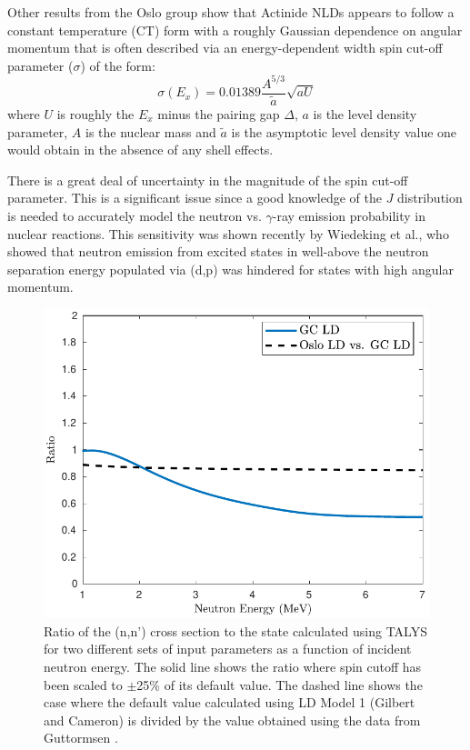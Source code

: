 \documentclass[letterpaper]{ar-1col}
\newcommand{\pp}[1]{\left( #1\right)}
\begin{document}
Other results from the Oslo group show that Actinide NLDs appears to follow a constant temperature (CT) form with a roughly Gaussian dependence on angular momentum that is often described via an energy-dependent width spin cut-off parameter ($\sigma$) of the form: 
\begin{equation}\label{eqn:spin_cutoff}
\sigma\pp{E_x}=0.01389 \dfrac{A^{5/3}}{\widetilde{a}}\sqrt{aU}
\end{equation}
where $U$ is roughly the $E_x$ minus the pairing gap $\Delta$, $a$ is the level density parameter, $A$ is the nuclear mass and $\widetilde{a}$ is the asymptotic level density value one would obtain in the absence of any shell effects.


There is a great deal of uncertainty in the magnitude of the spin cut-off parameter.
 This is a significant issue since a good knowledge of the $J$ distribution is needed to accurately model the neutron vs. $\gamma$-ray emission probability in nuclear reactions.
 This sensitivity was shown recently by Wiedeking et al., \cite{Wie16} who showed that neutron emission from excited states in  well-above the neutron separation energy populated via (d,p) was hindered for states with high angular momentum.




\begin{figure}
 \centering
 \includegraphics[width=0.7\linewidth]{fig3.pdf}

 \caption{Ratio of the (n,n') cross section to the state calculated using TALYS for two different sets of input parameters as a function of incident neutron energy.
The solid line shows the ratio where spin cutoff has been scaled to $\pm$25\% of its default value.
The dashed line shows the case where the default value calculated using LD Model 1 (Gilbert and Cameron) is divided by the value obtained using the data from Guttormsen \cite{Gut13a}.}
 \label{fig:oslo_ld_plot}
\end{figure}
\end{document}
